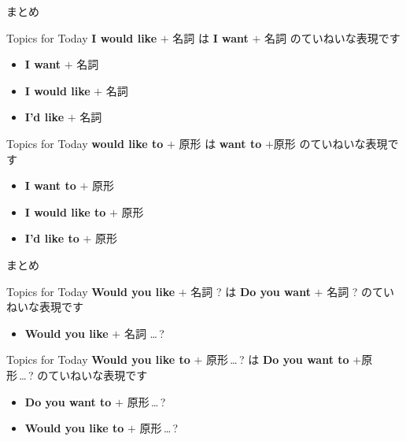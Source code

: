 \documentclass[aspectratio=169,xcolor={dvipsnames,table}]{beamer}
\begin{document}
\begin{frame}[plain]{まとめ}
 \begin{block}{Topics for Today}\small
\textbf{I would like} $+$ 名詞\,\,は\,\,\textbf{I want} $+$ 名詞\,\,のていねいな表現です
\begin{itemize}[square]\small
 \item \textbf{I want} $+$ 名詞
 \item \textbf{I would like} $+$ 名詞
 \item \textbf{I'd like} $+$ 名詞
       \end{itemize}
\end{block}

\begin{block}{Topics for Today}\small
\textbf{would like to} $+$ 原形\,\,は\,\,\textbf{want to} $+$原形\,\,のていねいな表現です
\begin{itemize}[square]\small
 \item \textbf{I want to} $+$ 原形
 \item \textbf{I would like to} $+$ 原形
 \item \textbf{I'd like to} $+$ 原形
       \end{itemize}
\end{block}
\end{frame}
\begin{frame}[plain]{まとめ}
\begin{block}{Topics for Today}\small
\textbf{Would you like} $+$ 名詞\,\,?\,\,は\,\,\textbf{Do you want} $+$ 名詞\,\,?\,\,のていねいな表現です
\begin{itemize}[square]\small
 \item \textbf{Would you like} $+$ 名詞 \ldots\,?
       \end{itemize}
\end{block}

\begin{block}{Topics for Today}\small
\textbf{Would you like to} $+$ 原形\,\ldots\,?\,\,は\,\,\textbf{Do you want to} $+$原形\,\ldots\,?\,\,のていねいな表現です
\begin{itemize}[square]\small
 \item \textbf{Do you want to} $+$ 原形\,\ldots\,?
 \item \textbf{Would you like to} $+$ 原形\,\ldots\,?
       \end{itemize}
\end{block}
\end{frame}
\end{document}
